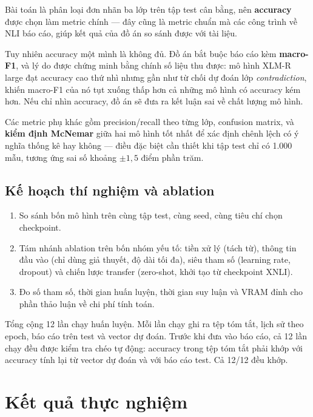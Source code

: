 \documentclass[12pt,a4paper,oneside]{report}
\begin{document}
Bài toán là phân loại đơn nhãn ba lớp trên tập test cân bằng, nên \textbf{accuracy} được
chọn làm metric chính --- đây cũng là metric chuẩn mà các công trình về NLI báo cáo, giúp
kết quả của đồ án so sánh được với tài liệu.

Tuy nhiên accuracy một mình là không đủ. Đồ án bắt buộc báo cáo kèm \textbf{macro-F1}, và
lý do được chứng minh bằng chính số liệu thu được: mô hình XLM-R large đạt accuracy cao
thứ nhì nhưng gần như từ chối dự đoán lớp \textit{contradiction}, khiến macro-F1 của nó
tụt xuống thấp hơn cả những mô hình có accuracy kém hơn. Nếu chỉ nhìn accuracy, đồ án sẽ
đưa ra kết luận sai về chất lượng mô hình.

Các metric phụ khác gồm precision/recall theo từng lớp, confusion matrix, và
\textbf{kiểm định McNemar} giữa hai mô hình tốt nhất để xác định chênh lệch có ý nghĩa
thống kê hay không --- điều đặc biệt cần thiết khi tập test chỉ có 1.000 mẫu, tương ứng
sai số khoảng $\pm 1{,}5$ điểm phần trăm.

\section{Kế hoạch thí nghiệm và ablation}

\begin{enumerate}[leftmargin=*,itemsep=3pt]
  \item So sánh bốn mô hình trên cùng tập test, cùng seed, cùng tiêu chí chọn checkpoint.
  \item Tám nhánh ablation trên bốn nhóm yếu tố: tiền xử lý (tách từ), thông tin đầu vào
        (chỉ dùng giả thuyết, độ dài tối đa), siêu tham số (learning rate, dropout) và
        chiến lược transfer (zero-shot, khởi tạo từ checkpoint XNLI).
  \item Đo số tham số, thời gian huấn luyện, thời gian suy luận và VRAM đỉnh cho phần thảo
        luận về chi phí tính toán.
\end{enumerate}

Tổng cộng 12 lần chạy huấn luyện. Mỗi lần chạy ghi ra tệp tóm tắt, lịch sử theo epoch,
báo cáo trên test và vector dự đoán. Trước khi đưa vào báo cáo, cả 12 lần chạy đều được
kiểm tra chéo tự động: accuracy trong tệp tóm tắt phải khớp với accuracy tính lại từ vector
dự đoán và với báo cáo test. Cả 12/12 đều khớp.

\chapter{Kết quả thực nghiệm}
\end{document}
